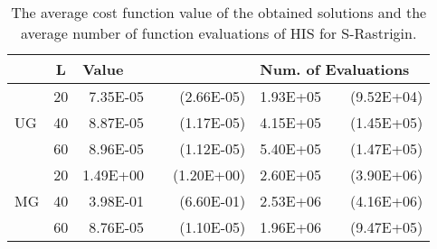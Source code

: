 \begin{table}[tbp]
\centering 
\caption{The average cost function value of the obtained solutions and the average number of function
 evaluations  of HIS for S-Rastrigin.}
\begin{tabular}{|lr|rr|rr|} \hline
\multicolumn{1}{|l|}{}&\multicolumn{1}{|c|}{L} & \multicolumn{2}{l|}{Value} & \multicolumn{2}{l|}{Num. of Evaluations} \\ \hline
\multicolumn{1}{|l|}{\multirow{3}{*}{UG}} & 20 & 7.35E-05 & ~~(2.66E-05) & 1.93E+05 & ~~(9.52E+04) \\ \cline{2-6}
\multicolumn{1}{|l|}{} & 40 & 8.87E-05 & ~~(1.17E-05) & 4.15E+05 & ~~(1.45E+05) \\ \cline{2-6}
\multicolumn{1}{|l|}{} & 60 & 8.96E-05 & ~~(1.12E-05) & 5.40E+05 & ~~(1.47E+05) \\ \hline
\multicolumn{1}{|l|}{\multirow{3}{*}{MG}} & 20 & 1.49E+00 & ~~(1.20E+00) & 2.60E+05 & ~~(3.90E+06) \\ \cline{2-6}
\multicolumn{1}{|l|}{} & 40 & 3.98E-01 & ~~(6.60E-01) & 2.53E+06 & ~~(4.16E+06) \\ \cline{2-6}
\multicolumn{1}{|l|}{} & 60 & 8.76E-05 & ~~(1.10E-05) & 1.96E+06 & ~~(9.47E+05) \\ \hline
\end{tabular}
\label{aexp-cont-srast-his}
\end{table}
